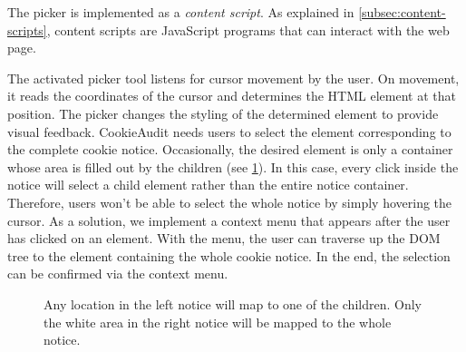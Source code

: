 The picker is implemented as a \emph{content script}. 
As explained in \cref{subsec:content-scripts}, content scripts are JavaScript programs that can interact with the web page.

The activated picker tool listens for cursor movement by the user. 
On movement, it reads the coordinates of the cursor and determines the HTML element at that position.
The picker changes the styling of the determined element to provide visual feedback.
CookieAudit needs users to select the element corresponding to the complete cookie notice. 
Occasionally, the desired element is only a container whose area is filled out by the children (see \cref{fig:notice-fillout}).
In this case, every click inside the notice will select a child element rather than the entire notice container. 
Therefore, users won't be able to select the whole notice by simply hovering the cursor.
As a solution, we implement a context menu that appears after the user has clicked on an element.
With the menu, the user can traverse up the DOM tree to the element containing the whole cookie notice.
In the end, the selection can be confirmed via the context menu.


\begin{figure}
	\centering
	\begin{minipage}{0.48\textwidth}
		\centering
	\end{minipage}\hfill
	\begin{minipage}{0.48\textwidth}
		\centering
	\end{minipage}
	\caption{Any location in the left notice will map to one of the children. Only the white area in the right notice will be mapped to the whole notice.}
	\label{fig:notice-fillout}
\end{figure}

